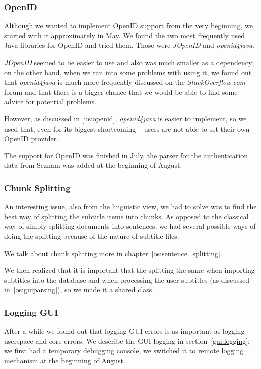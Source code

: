 \subsubsection{OpenID}
\label{subsubsec:openid}

Although we wanted to implement OpenID support from the very beginning, 
we started with it approximately in May. We found the two most frequently 
used Java libraries for OpenID and tried them. Those were \emph{JOpenID} 
and \emph{openid4java}.

\emph{JOpenID} seemed to be easier to use and also was much smaller as a 
dependency; on the other hand, when we ran into some problems with using 
it, we found out that \emph{openid4java} is much more frequently 
discussed on the \emph{StackOverflow.com} forum and that there is a 
bigger chance that we would be able to find some advice for potential 
problems. 

However, as discussed in \ref{us:openid}, \emph{openid4java} is easier to implement, so we used that, even for its biggest shortcoming -- users are not able to set their own OpenID provider.

The support for OpenID was finished in July, the parser for the authentication data from Seznam was added at the beginning of August.

\subsubsection{Chunk Splitting}

An interesting issue, also from the linguistic view, we had to solve was to find the best way of splitting the subtitle items into chunks. As opposed to the classical way of simply splitting documents into sentences, we had several possible ways of doing the splitting because of the nature of subtitle files.

We talk about chunk splitting more in chapter~\ref{os:sentence_splitting}.

We then realized that it is important that the splitting the same when importing subtitles into the database and when processing the user subtitles (as discussed in~\ref{os:guiparsing}), so we made it a shared class.

\subsubsection{Logging GUI}

After a while we found out that logging GUI errors is as important as logging userspace and core errors. We describe the GUI logging in section~\ref{gui:logging}; we first had a temporary debugging console, we switched it to remote logging mechanism at the beginning of August.

